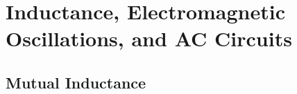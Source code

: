 \chapter{Inductance, Electromagnetic Oscillations, and AC Circuits}

\section{Mutual Inductance}

\begin{definition}
    
\end{definition}